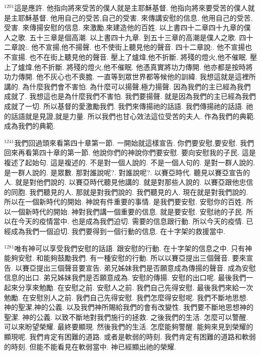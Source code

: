 \documentclass{book}
\begin{document}
$^{1201}$這是應許.
他指向將來受苦的僕人就是主耶穌基督.
他指向將來要受苦的僕人就是主耶穌基督.
他用自己的受苦,自己的受害.
來傳講安慰的信息.
他用自己的受苦,受害.
來傳揚安慰的信息.
來激勵,來建造他的百姓.
以上書四十二章四十九章的僕人之歌.
五十三章是個高潮.
以上書四十九章.
到五十三章的高潮是僕人之歌.
四十二章說:.
他不宣揚,他不揚聲.
也不使街上聽見他的聲音.
四十二章說:.
他不宣揚也不宣揚.
也不在街上聽見他的聲音.
壓上了爐煒,他不折斷.
將殘的燈火,他不催眠.
壓上了爐煒,他不折斷.
將殘的燈火,他不催眠.
他憑真實將功力傳開.
他亦都是按時將功力傳開.
他不灰心也不喪膽.
一直等到眾世界都等候他的訓緯.
我想這就是這裡所講的.
為什麼我們會不害怕.
為什麼可以揚聲,極力揚聲.
因為我們的主已經為我們成就了.
我想這也是為什麼我們不害怕.
我們要揚聲.
就是因為我們的主已經為我們成就了一切.
所以基督的愛激勵我們.
我們來傳揚祂的話語.
我們傳揚祂的話語.
祂的話語就是見證,就是力量.
所以我們也甘心效法這位受苦的夫人.
作為我們的典範.
成為我們的典範.

$^{1241}$我們回過頭來看第四十章第一節.
一開始就這樣宣告.
你們要安慰,要安慰.
我們回來再看第四十章的第一節.
他說你們的神說你們要安慰.
要向安慰我的子民.
這是複述了起始句.
這是複述的.
不是對一個人說的.
不是一個人句的.
是對一群人說的.
是一群人說的.
是眾數.
那對誰說呢?.
對誰說呢?.
以賽亞時代.
聽見以賽亞宣告的人.
就是對他們說的.
以賽亞時代聽見他講的.
就是對那些人說的.
以賽亞跟他忠信的同胞.
我們聽見的人.
那就是對我們說的.
我們聽見的人.
現在就是對我們說的.
所以在一個新時代的開始.
神說有件重要的事情.
是我們要安慰.
安慰你的百姓.
所以一個新時代的開始.
神對我們講一個重要的信息.
就是要安慰.
安慰祂的子民.
所以在今天的疫情當中.
也是成為我們迫切.
需要的信息跟行動.
所以今天的疫情.
已經成為我們一個迫切.
我們要得到一個行動的信息.
在十字架的救援當中.

$^{1281}$唯有神可以享受我們安慰的話語.
跟安慰的行動.
在十字架的信息之中.
只有神能夠安慰.
和能夠鼓勵我們.
有一種安慰的行動.
所以以賽亞提出三個聲音.
要來宣告.
以賽亞提出三個聲音要宣告.
弟兄姊妹我們是否願意成為傳揚的聲音.
成為安慰信息的出口.
弟兄姊妹我們是否願意成為.
安慰的傳揚.
安慰的出口呢.
最後我們一起來分享來勉勵.
在安慰之前.
安慰人之前.
我們自己先得安慰.
最後我們來給一次勉勵.
在安慰別人之前.
我們自己先得安慰.
我們怎麼得安慰呢.
我們不斷地思想.
神的聖潔,神的公義.
以及我們神所賜給我們的會有改變性.
我們要不斷地思想神的聖潔.
神的公義.
以致不斷地對我們施行的拯救.
之後我們的生活.
怎麼可以警醒.
可以來盼望榮耀.
最終要顯現.
然後我們的生活.
怎麼能夠警醒.
能夠來見到榮耀的顯現呢.
我們肯定有困難的道路.
或者是軟弱的時刻.
我們肯定有困難的道路和軟弱的時刻.
但能不能看見在軟弱當中.
神已經顯出祂的榮耀.
\end{document}
